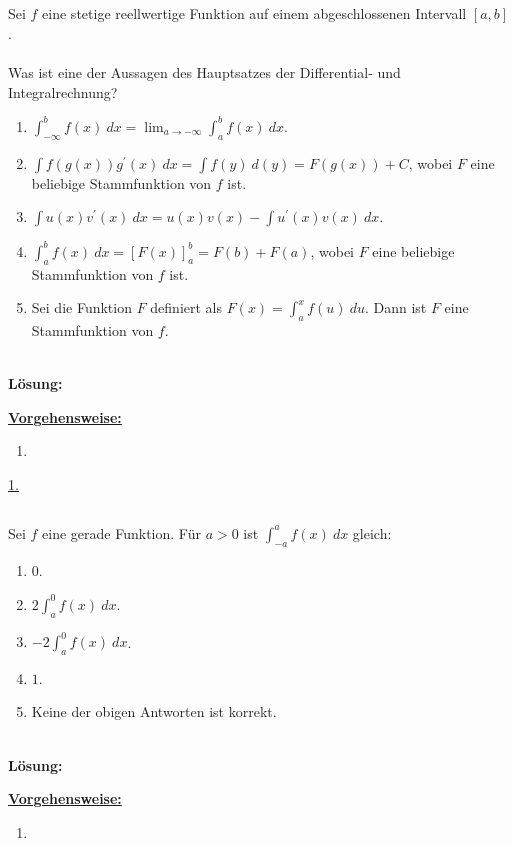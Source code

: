 \subsection*{}
Sei $f$ eine stetige reellwertige Funktion auf einem abgeschlossenen Intervall $[a,b]$.\\
\\
Was ist eine der Aussagen des Hauptsatzes der Differential- und Integralrechnung?
\renewcommand{\labelenumi}{(\alph{enumi})}
\begin{enumerate}
	\item 
	$\int_{-\infty}^b f(x) \ dx = 
	\lim_{a \to -\infty} \int_{a}^b f(x) \ dx
	$.
	\item 
	$\int f(g(x)) g^\prime(x) \ dx
	= \int f(y) \ d(y)
	= F(g(x) ) + C
	$, wobei $F$ eine beliebige Stammfunktion von $f$ ist.
	\item 
	$\int u(x) v^\prime(x) \ dx = u(x) v(x)  - \int u^\prime(x) v(x) \ dx$.
	\item 
	$\int_a^b f(x) \ dx
	=\left[F(x)\right]_a^b= F(b) +F(a)
	$, wobei $F$ eine beliebige Stammfunktion von $f$ ist.
	\item 
	Sei die Funktion $F$ definiert als $F(x) = \int_a^x f(u) \ du$.
	Dann ist $F$ eine Stammfunktion von $f$.
\end{enumerate}
\ \\
\textbf{Lösung:}
\begin{mdframed}
\underline{\textbf{Vorgehensweise:}}
\renewcommand{\labelenumi}{\theenumi.}
\begin{enumerate}
\item 
\end{enumerate}
\end{mdframed}

\underline{1. }\\


\newpage

\subsection*{}
Sei $ f $ eine gerade Funktion.
Für $a > 0$ ist $\int_{-a}^a f(x) \ dx$ gleich:
\renewcommand{\labelenumi}{(\alph{enumi})}
\begin{enumerate}
	\item 
	$ 0 $.
	\item
	$ 2 \int_a^0 f(x) \ dx $.
	\item
	$ -2  \int_a^0 f(x) \ dx$.
	\item
	$ 1 $.
	\item
	Keine der obigen Antworten ist korrekt.
\end{enumerate}
\ \\
\textbf{Lösung:}
\begin{mdframed}
\underline{\textbf{Vorgehensweise:}}
\renewcommand{\labelenumi}{\theenumi.}
\begin{enumerate}
\item 
\end{enumerate}
\end{mdframed}

